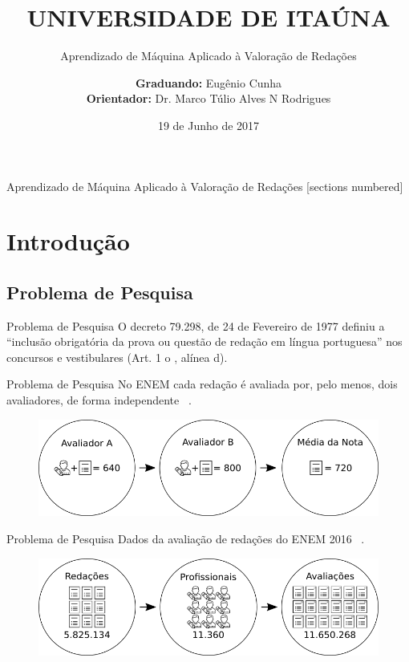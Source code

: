 \documentclass[10pt]{beamer}
\title{UNIVERSIDADE DE ITAÚNA}
\subtitle{Aprendizado de Máquina Aplicado à Valoração de Redações}
\date{19 de Junho de 2017}
\author{\textbf{Graduando:} Eugênio Cunha \\ \textbf{Orientador:} Dr. Marco Túlio Alves N Rodrigues}
\institute{{Departamento de Ciência da Computação \small} \\ {Bacharelado em Ciência da Computação \small}}
\begin{document}
\maketitle

\begin{frame}{Aprendizado de Máquina Aplicado à Valoração de Redações}
  [sections numbered]
  \tableofcontents[subsectionstyle=show]
\end{frame}

\section{Introdução}

  \subsection{Problema de Pesquisa}
    \begin{frame}[fragile]{Problema de Pesquisa}
    O decreto 79.298, de 24 de Fevereiro de 1977 definiu a “inclusão obrigatória da prova ou questão de redação em língua portuguesa” nos concursos e vestibulares (Art. 1 o , alínea d).
    \end{frame}

    \begin{frame}[fragile]{Problema de Pesquisa}
    No ENEM cada redação é avaliada por, pelo menos, dois avaliadores, de forma independente ~\cite{edital_enem:2016}.
    \begin{figure}[H]
    \begin{center}
        \includegraphics[scale=0.50]{images/correction_redaction_enem.png}
    \end{center}
    \end{figure}
    \end{frame}

    \begin{frame}[fragile]{Problema de Pesquisa}
    Dados da avaliação de redações do ENEM 2016 ~\cite{paq_a:2016}.
    \begin{figure}[H]
    \begin{center}
        \includegraphics[scale=0.50]{images/enem_2016.png}
    \end{center}
    \end{figure}
    \end{frame}
\end{document}
